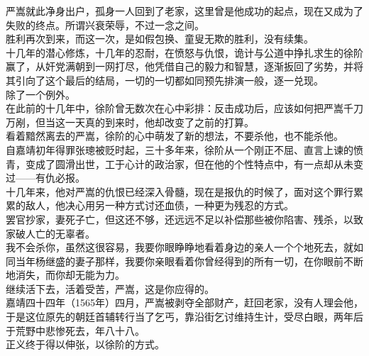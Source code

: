 \begin{multicols}{\theparacolNo}
严嵩就此净身出户，孤身一人回到了老家，这里曾是他成功的起点，现在又成为了失败的终点。所谓兴衰荣辱，不过一念之间。\\

胜利再次到来，而这一次，是如假包换、童叟无欺的胜利，没有续集。\\

十几年的潜心修炼，十几年的忍耐，在愤怒与仇恨，诡计与公道中挣扎求生的徐阶赢了，从奸党满朝到一网打尽，他凭借自己的毅力和智慧，逐渐扳回了劣势，并将其引向了这个最后的结局，一切的一切都如同预先排演一般，逐一兑现。\\

除了一个例外。\\

在此前的十几年中，徐阶曾无数次在心中彩排：反击成功后，应该如何把严嵩千刀万剐，但当这一天真的到来时，他却改变了之前的打算。\\

看着黯然离去的严嵩，徐阶的心中萌发了新的想法，不要杀他，也不能杀他。\\

自嘉靖初年得罪张璁被贬时起，三十多年来，徐阶从一个刚正不屈、直言上谏的愤青，变成了圆滑出世，工于心计的政治家，但在他的个性特点中，有一点却从未变过——有仇必报。\\

十几年来，他对严嵩的仇恨已经深入骨髓，现在是报仇的时候了，面对这个罪行累累的敌人，他决心用另一种方式讨还血债，一种更为残忍的方式。\\

罢官抄家，妻死子亡，但这还不够，还远远不足以补偿那些被你陷害、残杀，以致家破人亡的无辜者。\\

我不会杀你，虽然这很容易，我要你眼睁睁地看着身边的亲人一个个地死去，就如同当年杨继盛的妻子那样，我要你亲眼看着你曾经得到的所有一切，在你眼前不断地消失，而你却无能为力。\\

继续活下去，活着受苦，严嵩，这是你应得的。\\

嘉靖四十四年（1565年）四月，严嵩被剥夺全部财产，赶回老家，没有人理会他，于是这位原先的朝廷首辅转行当了乞丐，靠沿街乞讨维持生计，受尽白眼，两年后于荒野中悲惨死去，年八十八。\\

正义终于得以伸张，以徐阶的方式。\\

\ifnum{}
	\end{multicols}
\fi
\newpage
